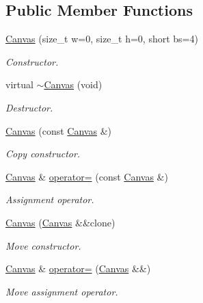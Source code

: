 \subsection*{Public Member Functions}
\begin{DoxyCompactItemize}
\item 
\mbox{\hyperlink{classlife_1_1_canvas_ac719467462d0e2267cab32c5726b890a}{Canvas}} (size\+\_\+t w=0, size\+\_\+t h=0, short bs=4)
\begin{DoxyCompactList}\small\item\em Constructor. \end{DoxyCompactList}\item 
virtual \mbox{\hyperlink{classlife_1_1_canvas_a39370c890281ecd237ab35af1afff372}{$\sim$\+Canvas}} (void)
\begin{DoxyCompactList}\small\item\em Destructor. \end{DoxyCompactList}\item 
\mbox{\hyperlink{classlife_1_1_canvas_a9abdcf7e5ad25469bf095eb7c7d067af}{Canvas}} (const \mbox{\hyperlink{classlife_1_1_canvas}{Canvas}} \&)
\begin{DoxyCompactList}\small\item\em Copy constructor. \end{DoxyCompactList}\item 
\mbox{\hyperlink{classlife_1_1_canvas}{Canvas}} \& \mbox{\hyperlink{classlife_1_1_canvas_a9263b4e39d40060948b8d0744f1cb5ca}{operator=}} (const \mbox{\hyperlink{classlife_1_1_canvas}{Canvas}} \&)
\begin{DoxyCompactList}\small\item\em Assignment operator. \end{DoxyCompactList}\item 
\mbox{\hyperlink{classlife_1_1_canvas_a1d7a3dff13b38fd9d8323919c1ca6e41}{Canvas}} (\mbox{\hyperlink{classlife_1_1_canvas}{Canvas}} \&\&clone)
\begin{DoxyCompactList}\small\item\em Move constructor. \end{DoxyCompactList}\item 
\mbox{\hyperlink{classlife_1_1_canvas}{Canvas}} \& \mbox{\hyperlink{classlife_1_1_canvas_ab0995a0cbff8bf9c701553c6871c20b9}{operator=}} (\mbox{\hyperlink{classlife_1_1_canvas}{Canvas}} \&\&)
\begin{DoxyCompactList}\small\item\em Move assignment operator. \end{DoxyCompactList}\item 

\end{DoxyCompactItemize}
